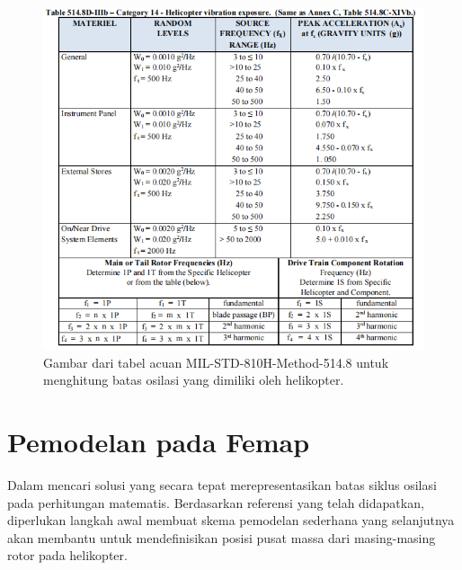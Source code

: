 \begin{figure}[H]
	\centering
	\includegraphics[width=\linewidth]{gambar/MIL_STD.png}
	\caption{Gambar dari tabel acuan MIL-STD-810H-Method-514.8 untuk menghitung batas osilasi yang dimiliki oleh helikopter.}
	\label{fig:MIL_STD}
\end{figure}


\section{Pemodelan pada Femap}
	\label{sec:femap}
Dalam mencari solusi yang secara tepat merepresentasikan batas siklus osilasi pada perhitungan matematis. Berdasarkan referensi yang telah didapatkan, diperlukan langkah awal membuat skema pemodelan sederhana yang selanjutnya akan membantu untuk mendefinisikan posisi pusat massa dari masing-masing rotor pada helikopter. 